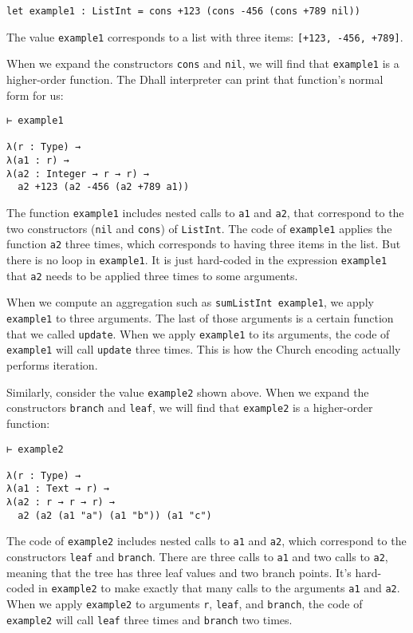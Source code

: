 \begin{lstlisting}[language=Dhall]
let example1 : ListInt = cons +123 (cons -456 (cons +789 nil))
\end{lstlisting}


The value \lstinline!example1! corresponds to a list with three items: \lstinline![+123, -456, +789]!.


When we expand the constructors \lstinline!cons! and \lstinline!nil!, we will find that \lstinline!example1! is a higher-order function.
The Dhall interpreter can print that function's normal form for us:


\begin{lstlisting}[language=Dhall]
⊢ example1

λ(r : Type) →
λ(a1 : r) →
λ(a2 : Integer → r → r) →
  a2 +123 (a2 -456 (a2 +789 a1))
\end{lstlisting}


The function \lstinline!example1! includes nested calls to \lstinline!a1! and \lstinline!a2!, that correspond to the two constructors (\lstinline!nil! and \lstinline!cons!) of \lstinline!ListInt!.
The code of \lstinline!example1! applies the function \lstinline!a2! three times, which corresponds to having three items in the list.
But there is no loop in \lstinline!example1!.
It is just hard-coded in the expression \lstinline!example1! that \lstinline!a2! needs to be applied three times to some arguments.


When we compute an aggregation such as \lstinline!sumListInt example1!, we apply \lstinline!example1! to three arguments.
The last of those arguments is a certain function that we called \lstinline!update!.
When we apply \lstinline!example1! to its arguments, the code of \lstinline!example1! will call \lstinline!update! three times.
This is how the Church encoding actually performs iteration.


Similarly, consider the value \lstinline!example2! shown above.
When we expand the constructors \lstinline!branch! and \lstinline!leaf!, we will find that \lstinline!example2! is a higher-order function:


\begin{lstlisting}[language=Dhall]
⊢ example2

λ(r : Type) →
λ(a1 : Text → r) →
λ(a2 : r → r → r) →
  a2 (a2 (a1 "a") (a1 "b")) (a1 "c")
\end{lstlisting}


The code of \lstinline!example2! includes nested calls to \lstinline!a1! and \lstinline!a2!, which correspond to the constructors \lstinline!leaf! and \lstinline!branch!.
There are three calls to \lstinline!a1! and two calls to \lstinline!a2!, meaning that the tree has three leaf values and two branch points.
It's hard-coded in \lstinline!example2! to make exactly that many calls to the arguments \lstinline!a1! and \lstinline!a2!.
When we apply \lstinline!example2! to arguments \lstinline!r!, \lstinline!leaf!, and \lstinline!branch!, the code of \lstinline!example2! will call \lstinline!leaf! three times and \lstinline!branch! two times.


